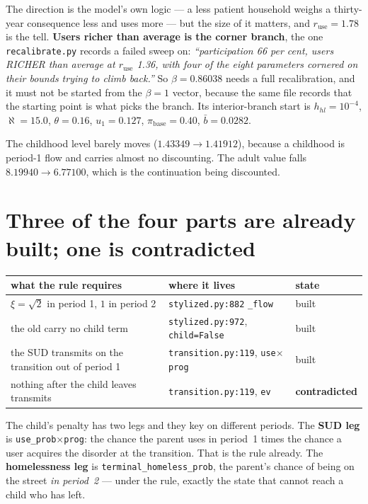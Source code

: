 \documentclass[11pt]{article}
\begin{document}
\medskip
\noindent The direction is the model's own logic --- a less patient household
weighs a thirty-year consequence less and uses more --- but the size of it
matters, and $r_{\text{use}}=1.78$ is the tell. \textbf{Users richer than
average is the corner branch}, the one \texttt{recalibrate.py} records a failed
sweep on: \emph{``participation 66 per cent, users RICHER than average at
$r_{\text{use}}$ 1.36, with four of the eight parameters cornered on their
bounds trying to climb back.''} So $\beta=0.86038$ needs a full recalibration,
and it must not be started from the $\beta=1$ vector, because the same file
records that the starting point is what picks the branch. Its interior-branch
start is $h_{hl}=10^{-4}$, $\aleph=15.0$, $\theta=0.16$, $u_1=0.127$,
$\pi_{\text{base}}=0.40$, $\bar b=0.0282$.

The childhood level barely moves ($1.43349\to1.41912$), because a childhood is
period-1 flow and carries almost no discounting. The adult value falls
$8.19940\to6.77100$, which is the continuation being discounted.

\section{Three of the four parts are already built; one is contradicted}

\begin{tabular}{@{}p{}p{}p{}@{}}
\toprule
what the rule requires & where it lives & state \\
\midrule
$\xi=\sqrt2$ in period 1, $1$ in period 2 & \texttt{stylized.py:882} \verb|_flow| & built \\
the old carry no child term & \texttt{stylized.py:972}, \verb|child=False| & built \\
the SUD transmits on the transition out of period 1 & \texttt{transition.py:119}, \verb|use|$\times$\verb|prog| & built \\
nothing after the child leaves transmits & \texttt{transition.py:119}, \verb|ev| & \textbf{contradicted} \\
\bottomrule
\end{tabular}

\medskip
\noindent The child's penalty has two legs and they key on different periods.
The \textbf{SUD leg} is \verb|use_prob|$\times$\verb|prog|: the chance the parent
uses in period~1 times the chance a user acquires the disorder at the
transition. That is the rule already. The \textbf{homelessness leg} is
\verb|terminal_homeless_prob|, the parent's chance of being on the street
\emph{in period~2} --- under the rule, exactly the state that cannot reach a
child who has left.
\end{document}
